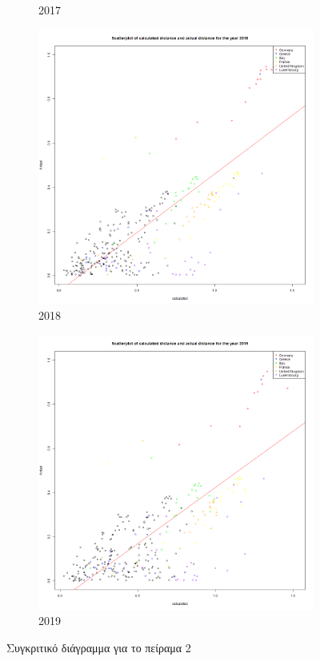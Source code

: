 \documentclass[a4paper,twoside,10pt]{article}
\begin{document}
\begin{figure}[H]
\begin{subfigure}[b]{0.3\textwidth}
			\caption{2017}
		\end{subfigure}
		\hfill
		\begin{subfigure}[b]{0.3\textwidth}
			\centering
			\includegraphics[width=\textwidth]{images/scatterplot_with_regression_line_ 2018 .png}
			\caption{2018}
		\end{subfigure}
		\hfill
		\begin{subfigure}[b]{0.3\textwidth}
			\centering
			\includegraphics[width=\textwidth]{images/scatterplot_with_regression_line_ 2019 .png}
			\caption{2019}
		\end{subfigure}
		\caption{Συγκριτικό διάγραμμα για το πείραμα 2}
		\label{Συγκριτικό.}
	\end{figure}
	
\end{document}
